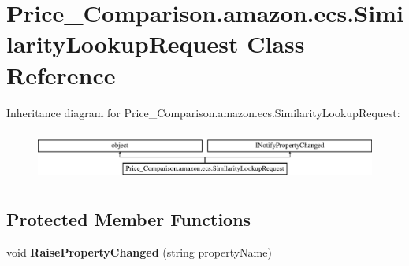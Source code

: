 \hypertarget{class_price___comparison_1_1amazon_1_1ecs_1_1_similarity_lookup_request}{\section{Price\-\_\-\-Comparison.\-amazon.\-ecs.\-Similarity\-Lookup\-Request Class Reference}
\label{class_price___comparison_1_1amazon_1_1ecs_1_1_similarity_lookup_request}
}


 


Inheritance diagram for Price\-\_\-\-Comparison.\-amazon.\-ecs.\-Similarity\-Lookup\-Request\-:\begin{figure}[H]
\begin{center}
\leavevmode
\includegraphics[height=1.671642cm]{class_price___comparison_1_1amazon_1_1ecs_1_1_similarity_lookup_request}
\end{center}
\end{figure}
\subsection*{Protected Member Functions}
\begin{DoxyCompactItemize}
\item 
\hypertarget{class_price___comparison_1_1amazon_1_1ecs_1_1_similarity_lookup_request_adabb9c308bcda09360a7e429ad4b79d4}{void {\bfseries Raise\-Property\-Changed} (string property\-Name)}\label{class_price___comparison_1_1amazon_1_1ecs_1_1_similarity_lookup_request_adabb9c308bcda09360a7e429ad4b79d4}

\end{DoxyCompactItemize}
